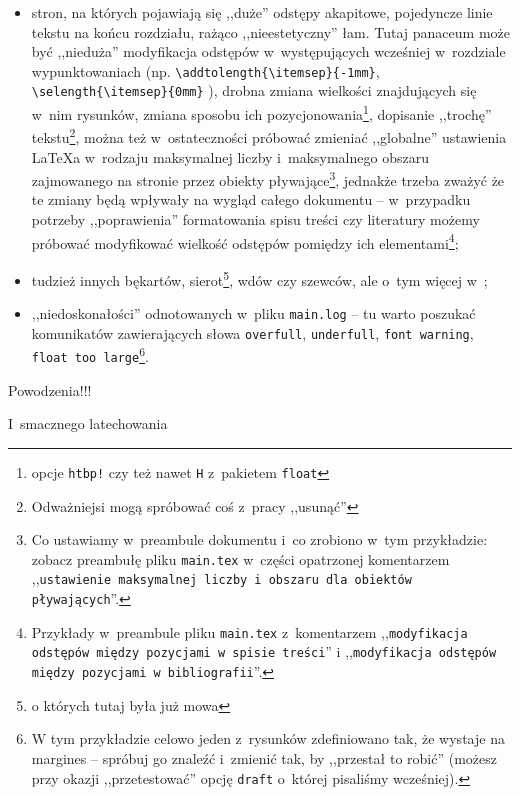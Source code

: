 \begin{enumerate}
\begin{itemize}
  \item stron, na których pojawiają się ,,duże'' odstępy akapitowe, pojedyncze linie tekstu na końcu rozdziału, rażąco ,,nieestetyczny'' łam. Tutaj panaceum może być ,,nieduża'' modyfikacja odstępów w~występujących wcześniej w~rozdziale wypunktowaniach (np. \verb+\addtolength{\itemsep}{-1mm}+, \verb+\selength{\itemsep}{0mm}+ ), drobna zmiana wielkości znajdujących się w~nim rysunków, zmiana sposobu ich pozycjonowania\footnote{opcje \texttt{htbp!} czy też nawet \texttt{H} z~pakietem \texttt{float}}, dopisanie ,,trochę'' tekstu\footnote{Odważniejsi mogą spróbować coś z~pracy ,,usunąć'' \smiley}, można też w~ostateczności próbować zmieniać ,,globalne'' ustawienia \LaTeX{}a w~rodzaju maksymalnej liczby i~maksymalnego obszaru zajmowanego na stronie przez obiekty pływające\footnote{Co ustawiamy w~preambule dokumentu i~co zrobiono w~tym przykładzie: zobacz preambułę pliku \texttt{main.tex} w~części opatrzonej komentarzem ,,\texttt{ustawienie maksymalnej liczby i obszaru dla obiektów pływających}''.}, jednakże trzeba zważyć że te zmiany będą wpływały na wygląd całego dokumentu -- w~przypadku potrzeby ,,poprawienia'' formatowania spisu treści czy literatury możemy próbować modyfikować wielkość odstępów pomiędzy ich elementami\footnote{Przykłady w~preambule pliku \texttt{main.tex} z~komentarzem ,,\texttt{modyfikacja odstępów między pozycjami w spisie treści}'' i ,,\texttt{modyfikacja odstępów między pozycjami w bibliografii}''.};
    
  \item tudzież innych bękartów, sierot\footnote{o których tutaj była już mowa}, wdów czy szewców, ale o~tym więcej w~\cite{sklad};

  \item ,,niedoskonałości'' odnotowanych w~pliku \texttt{main.log} -- tu warto poszukać komunikatów zawierających słowa \verb+overfull+, \verb+underfull+, \verb+font warning+, \verb+float too large+\footnote{W tym przykładzie celowo jeden z~rysunków zdefiniowano tak, że wystaje na margines -- spróbuj go znaleźć i~zmienić tak, by ,,przestał to robić'' (możesz przy okazji ,,przetestować'' opcję \texttt{draft} o~której pisaliśmy wcześniej).}.
    
  \end{itemize}
  
\end{enumerate}

Powodzenia!!!

I~smacznego latechowania \smiley
